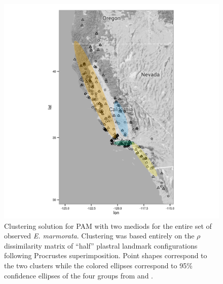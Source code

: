 \documentclass[12pt,letterpaper]{article}\usepackage{graphicx, color}
\begin{document}
\begin{figure}[ht]
  \centering
  \includegraphics{figure/gap_map}
  \caption{Clustering solution for PAM with two mediods for the entire set of observed \textit{E. marmorata}. Clustering was based entirely on the \(\rho\) dissimilarity matrix of ``half'' plastral landmark configurations following Procrustes superimposition. Point shapes correspond to the two clusters while the colored ellipses correspond to 95\% confidence ellipses of the four groups from \citet{Spinks2005} and \citet{Spinks2010}.}
  \label{fig:gap_map}
\end{figure}
\end{document}
